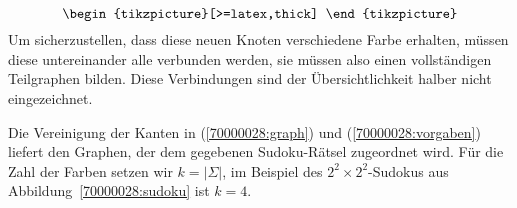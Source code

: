 \begin{loesung}
\begin{equation}
{\begin{tikzpicture}[>=latex,thick]
\end{tikzpicture}}
\label{70000028:vorgaben}
\end{equation}
Um sicherzustellen, dass diese neuen Knoten verschiedene Farbe erhalten,
müssen diese untereinander alle verbunden werden, sie müssen also
einen vollständigen Teilgraphen bilden.
Diese Verbindungen sind der Übersichtlichkeit halber nicht eingezeichnet.

Die Vereinigung der Kanten in (\ref{70000028:graph}) und
(\ref{70000028:vorgaben}) liefert den Graphen, der dem gegebenen
Sudoku-Rätsel zugeordnet wird.
Für die Zahl der Farben setzen wir $k=|\Sigma|$, im Beispiel des
$2^2\times 2^2$-Sudokus aus Abbildung~\ref{70000028:sudoku} ist $k=4$.


\end{loesung}
